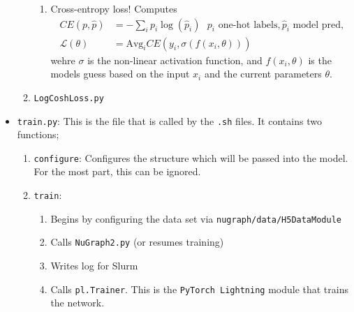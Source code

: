 \begin{itemize}
\begin{enumerate}
\begin{enumerate}
                \item Cross-entropy loss! Computes
                \begin{equation}
                    \begin{aligned}
                        CE(p,  \hat{p}) &= -\sum_ip_i\log(\hat{p}_i) \ \ \ p_i \text{ one-hot labels}, \hat{p}_i \text{ model pred,}\\
                        \mathcal{L}(\theta) &= \text{Avg}_i CE(y_i, \sigma(f(x_i, \theta)))
                    \end{aligned}
                \end{equation}
                wehre $\sigma$ is the non-linear activation function, and $f(x_i, \theta)$ is the models guess based on the input $x_i$ and the current parameters $\theta$. 
            \end{enumerate}

        \item \texttt{LogCoshLoss.py}
    \end{enumerate}

    \item \texttt{train.py}: This is the file that is called by the \texttt{.sh} files. It contains two functions;
        \begin{enumerate}
            \item \texttt{configure}: Configures the structure which will be passed into the model. For the most part, this can be ignored. 

            \item \texttt{train}: 
                \begin{enumerate}
                    \item Begins by configuring the data set via \texttt{nugraph/data/H5DataModule}
                    \item Calls \texttt{NuGraph2.py} (or resumes training)
                    \item Writes log for Slurm
                    \item Calls \texttt{pl.Trainer}. This is the \texttt{PyTorch Lightning} module that trains the network.
                \end{enumerate}
        \end{enumerate}


\end{itemize}
